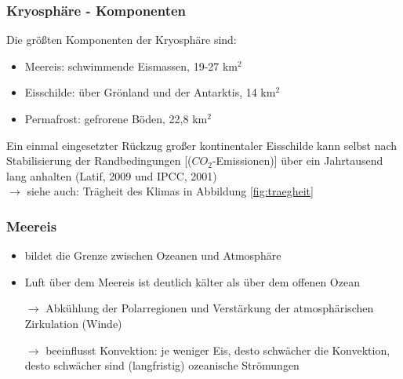 \begin{frame}
	\frametitle{Kryosphäre - Komponenten}
	Die größten Komponenten der Kryosphäre sind: 
	\begin{itemize}
		\item Meereis: schwimmende Eismassen, 19-27 km$^2$
		\item Eisschilde: über Grönland und der Antarktis, 14 km$^2$
		\item Permafrost: gefrorene Böden, 22,8 km$^2$
	\end{itemize}
	
	\glqq Ein einmal eingesetzter Rückzug großer kontinentaler Eisschilde kann selbst nach Stabilisierung der Randbedingungen [($CO_2$-Emissionen)] über ein Jahrtausend lang anhalten\grqq{} (Latif, 2009 und IPCC, 2001)\\
	$\rightarrow$ siehe auch: Trägheit des Klimas in Abbildung \ref{fig:traegheit}
	
\end{frame}

\begin{frame}
	\frametitle{Meereis}
	\begin{itemize}
		\item bildet die Grenze zwischen Ozeanen und Atmosphäre
		\item Luft über dem Meereis ist deutlich kälter als über dem offenen Ozean 
		\item [$\rightarrow$] Abkühlung der Polarregionen und Verstärkung der atmosphärischen Zirkulation (Winde)
		\item [$\rightarrow$] beeinflusst Konvektion: je weniger Eis, desto schwächer die Konvektion, desto schwächer sind (langfristig) ozeanische Strömungen 
	\end{itemize}

\end{frame}


